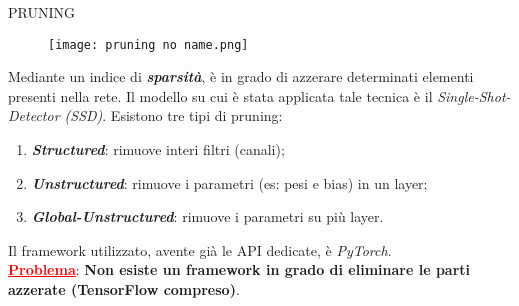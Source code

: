 \begin{frame}{PRUNING}
    \begin{figure}
        \texttt{[image: pruning no name.png]}
    \end{figure}
    Mediante un indice di {\bfseries{\emph{sparsità}}}, è in grado di azzerare determinati elementi presenti nella rete.
    Il modello su cui è stata applicata tale tecnica è il \emph{Single-Shot-Detector (SSD)}.
    Esistono tre tipi di pruning:
    \begin{enumerate}
        \item {\bfseries{\emph{Structured}}}: rimuove interi filtri (canali);
        \item {\bfseries{\emph{Unstructured}}}: rimuove i parametri (es: pesi e bias) in un layer;
        \item {\bfseries{\emph{Global-Unstructured}}}: rimuove i parametri su più layer.
    \end{enumerate}
    Il framework utilizzato, avente già le API dedicate, è \emph{PyTorch}.\\
    {\textcolor{red}{\textbf{\ul{Problema}}}}: {\bfseries{Non esiste un framework in grado di eliminare le parti azzerate (TensorFlow compreso)}}.
\end{frame}